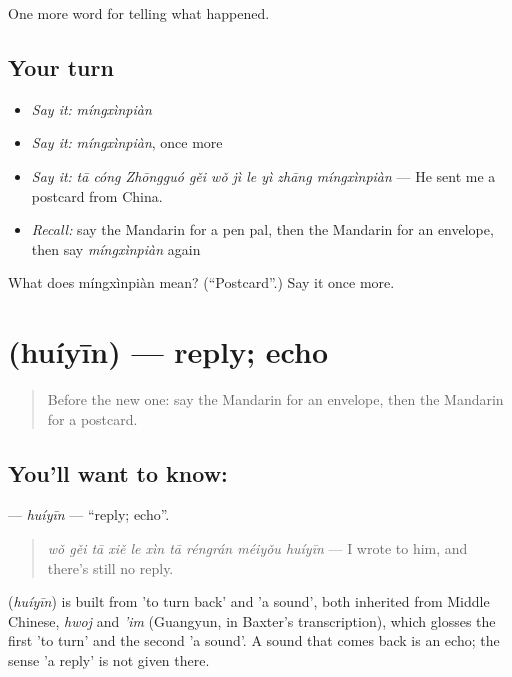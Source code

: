 \begin{grammarlens}[title={What you've built}]
One more word for telling what happened.
\end{grammarlens}

\subsection*{Your turn}
\begin{itemize}
\raggedright
  \item \emph{Say it:} \emph{míngxìnpiàn}
  \item \emph{Say it:} \emph{míngxìnpiàn}, once more
  \item \emph{Say it:} \emph{tā cóng Zhōngguó gěi wǒ jì le yì zhāng míngxìnpiàn} — He sent me a postcard from China.
  \item \emph{Recall:} say the Mandarin for a pen pal, then the Mandarin for an envelope, then say \emph{míngxìnpiàn} again
\end{itemize}

\begin{tcolorbox}[breakable,colback=teal!4,colframe=teal!35!black,title={Before you move on}]
What does míngxìnpiàn mean? (\textquotedblleft{}Postcard\textquotedblright{}.) Say it once more.
\end{tcolorbox}
\section[\texorpdfstring{\zh{回音} (huíyīn)}{回音 (huíyīn)}]{ (huíyīn) — reply; echo}

\label{lesson:ZH-C318-huiyin}



\begin{quote}
Before the new one: say the Mandarin for an envelope, then the Mandarin for a postcard.
\end{quote}

\subsection*{You'll want to know: }
\textbf{} — \emph{huíyīn} — \textquotedblleft{}reply; echo\textquotedblright{}.

\begin{quote}
\emph{wǒ gěi tā xiě le xìn tā réngrán méiyǒu huíyīn} — I wrote to him, and there's still no reply.
\end{quote}

\begin{cousinweb}
\textbf{} (\emph{huíyīn}) is built from  'to turn back' and  'a sound', both inherited from Middle Chinese, \emph{hwoj} and \emph{'im} (Guangyun, in Baxter's transcription), which glosses the first 'to turn' and the second 'a sound'. A sound that comes back is an echo; the sense 'a reply' is not given there.
\end{cousinweb}

